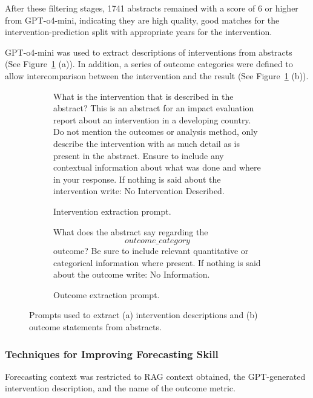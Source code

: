 \documentclass[12pt,a4paper]{article}
\begin{document}
After these filtering stages, 1741 abstracts remained with a score of 6 or higher from GPT-o4-mini, indicating they are high quality, good matches for the intervention-prediction split with appropriate years for the intervention.

GPT-o4-mini was used to extract descriptions of interventions from abstracts (See Figure~\ref{fig:prompts-ib} (a)). In addition, a series of outcome categories were defined to allow intercomparison between the intervention and the result (See Figure~\ref{fig:prompts-ib} (b)). 

\begin{figure}[htbp]
  \centering
  \begin{subfigure}{0.48\textwidth}
    \begin{tcolorbox}[left=4pt, right=4pt, top=4pt, bottom=4pt]
\ttfamily\footnotesize
What is the intervention that is described in the abstract? 
This is an abstract for an impact evaluation report about an intervention in a developing country. 
Do not mention the outcomes or analysis method, only describe the intervention with as much detail as is present in the abstract. 
Ensure to include any contextual information about what was done and where in your response. 
If nothing is said about the intervention write: No Intervention Described.
    \end{tcolorbox}
    \caption{Intervention extraction prompt.}
  \end{subfigure}\hfill
  \begin{subfigure}{0.48\textwidth}
    \begin{tcolorbox}[left=4pt, right=4pt, top=4pt, bottom=4pt]
\ttfamily\footnotesize
What does the abstract say regarding the \[outcome\_category\] outcome? 
Be sure to include relevant quantitative or categorical information where present. 
If nothing is said about the outcome write: No Information.
    \end{tcolorbox}
    \caption{Outcome extraction prompt.}
  \end{subfigure}
  \caption{Prompts used to extract (a) intervention descriptions and (b) outcome statements from abstracts.}
  \label{fig:prompts-ib}
\end{figure}

\subsubsection{Techniques for Improving Forecasting Skill}
Forecasting context was restricted to RAG context obtained, the GPT-generated intervention description, and the name of the outcome metric.
\end{document}
